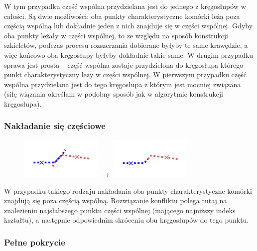 \documentclass[declaration,shortabstract,mgr]{iithesis}
\begin{document}
W tym przypadku część wspólna przydzielana jest do jednego z kręgosłupów w całości.
Są dwie możliwości: oba punkty charakterystyczne komórki leżą poza częścią wspólną lub dokładnie jeden z nich znajduje się w części wspólnej.
Gdyby oba punkty leżały w części wspólnej, to ze względu na sposób konstrukcji szkieletów, podczas procesu rozszerzania dobierane byłyby te same krawędzie, a więc końcowo oba kręgosłupy byłyby dokładnie takie same.
W drugim przypadku sprawa jest prosta -- część wspólna zostaje przydzielona do kręgosłupa którego punkt charakterystyczny leży w części wspólnej. W pierwszym przypadku część wspólna przydzielana jest do tego kręgosłupa z którym jest mocniej związana (siłę wiązania określam w podobny sposób jak w algorytmie konstrukcji kręgosłupa).

\subsubsection{Nakładanie się częściowe}

\begin{figure}[H]
  \centering
  \includegraphics[valign=m,width=0.35\textwidth]{images/overlap-p.png}
  $\rightarrow$
  \includegraphics[valign=m,width=0.35\textwidth]{images/overlap-p-solved.png}
\end{figure}

W przypadku takiego rodzaju nakładania oba punkty charakterystyczne komórki znajdują się poza częścią wspólną.
Rozwiązanie konfliktu polega tutaj na znalezieniu najsłabszego punktu części wspólnej (mającego najniższy indeks kształtu), a następnie odpowiednim skróceniu obu kręgosłupów do tego punktu.

\subsubsection{Pełne pokrycie}
\end{document}
